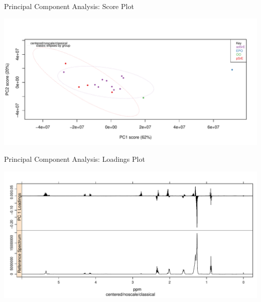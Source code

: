 \documentclass[aspectratio=169]{beamer}\usepackage[]{graphicx}\usepackage[]{color}
\makeatletter
\def\maxwidth{ %
  \ifdim\Gin@nat@width>\linewidth
    \linewidth
  \else
    \Gin@nat@width
  \fi
}
\newenvironment{knitrout}{}{} %
\makeatother
\begin{document}
\begin{frame}{Principal Component Analysis: Score Plot}

\begin{knitrout}
\color{fgcolor}
\includegraphics[width=\maxwidth]{figure/scores-1} 

\end{knitrout}

\end{frame}


\begin{frame}{Principal Component Analysis: Loadings Plot}

\begin{knitrout}
\color{fgcolor}
\includegraphics[width=\maxwidth]{figure/loadings-1} 

\end{knitrout}

\end{frame}

\end{document}
